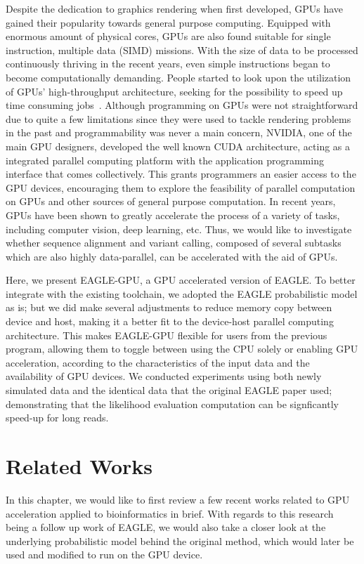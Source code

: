 \documentclass{PHlab-thesis}
\begin{document}
Despite the dedication to graphics rendering when first developed, GPUs have gained their popularity towards general purpose computing. Equipped with enormous amount of physical cores, GPUs are also found suitable for single instruction, multiple data (SIMD) missions. With the size of data to be processed continuously thriving in the recent years, even simple instructions began to become computationally demanding. People started to look upon the utilization of GPUs' high-throughput architecture, seeking for the possibility to speed up time consuming jobs~\cite{owens2008gpu,nickolls2010gpu}. Although programming on GPUs were not straightforward due to quite a few limitations since they were used to tackle rendering problems in the past and programmability was never a main concern, NVIDIA, one of the main GPU designers, developed the well known CUDA architecture, acting as a integrated parallel computing platform with the application programming interface that comes collectively. This grants programmers an easier access to the GPU devices, encouraging them to explore the feasibility of parallel computation on GPUs and other sources of general purpose computation. In recent years, GPUs have been shown to greatly accelerate the process of a variety of tasks, including computer vision, deep learning, etc. Thus, we would like to investigate whether sequence alignment and variant calling, composed of several subtasks which are also highly data-parallel, can be accelerated with the aid of GPUs.

Here, we present EAGLE-GPU, a GPU accelerated version of EAGLE.  To better integrate with the existing toolchain, we adopted the EAGLE probabilistic model as is; but we did make several adjustments to reduce memory copy between device and host, making it a better fit to the device-host parallel computing architecture.  This makes EAGLE-GPU flexible for users from the previous program, allowing them to toggle between using the CPU solely or enabling GPU acceleration, according to the characteristics of the input data and the availability of GPU devices.  We conducted experiments using both newly simulated data and the identical data that the original EAGLE paper used; demonstrating that the likelihood evaluation computation can be signficantly speed-up for long reads.

\chapter{Related Works}
In this chapter, we would like to first review a few recent works related to GPU acceleration applied to bioinformatics in brief. With regards to this research being a follow up work of EAGLE, we would also take a closer look at the underlying probabilistic model behind the original method, which would later be used and modified to run on the GPU device.
\end{document}
